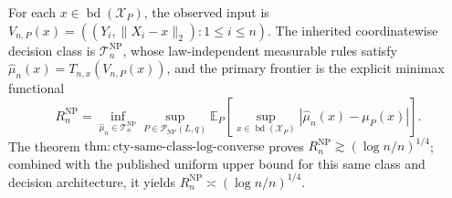 For each \(x\in\operatorname{bd}(\mathcal X_P)\), the observed input is \(V_{n,P}(x)=((Y_i,\lVert X_i-x\rVert_2):1\leq i\leq n)\).  The inherited coordinatewise decision class is \(\mathcal T_n^{\mathrm{NP}}\), whose law-independent measurable rules satisfy \(\widehat\mu_n(x)=T_{n,x}(V_{n,P}(x))\), and the primary frontier is the explicit minimax functional
\[
 R_n^{\mathrm{NP}}
 =\inf_{\widehat\mu_n\in\mathcal T_n^{\mathrm{NP}}}
 \sup_{P\in\mathcal P_{\mathrm{NP}}(L,q)}
 \mathbb E_P\!\left[
 \sup_{x\in\operatorname{bd}(\mathcal X_P)}
 |\widehat\mu_n(x)-\mu_P(x)|
 \right].
\]
The theorem \(\mathrm{thm:cty\text{-}same\text{-}class\text{-}log\text{-}converse}\) proves \(R_n^{\mathrm{NP}}\gtrsim(\log n/n)^{1/4}\); combined with the published uniform upper bound for this same class and decision architecture, it yields \(R_n^{\mathrm{NP}}\asymp(\log n/n)^{1/4}\).